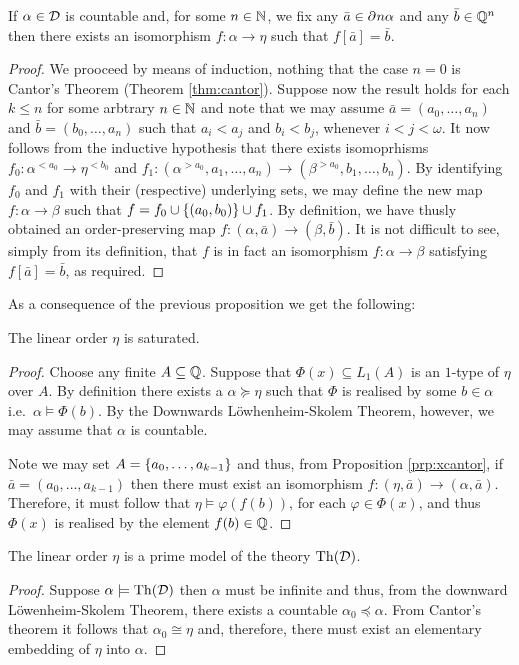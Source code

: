 \begin{prp}\label{prp:xcantor}
	If $\alpha\in\mathcal{D}$ is countable and, for some $n\in\mathbb{N}$, we fix any
	$\bar{a}\in\partial^{}{n}\alpha$ and any $\bar{b}\in\mathbb{Q}^n$ then there exists an
	isomorphism $f\colon\alpha\to\eta$ such that $f[\bar{a}]=\bar{b}$.
\end{prp}
\begin{proof}
	We prooceed by means of induction, nothing that the case $n=0$ is Cantor's
	Theorem (Theorem \ref{thm:cantor}).  Suppose now the result holds for each
	$k\leq n$ for some arbtrary $n\in\mathbb{N}$ and note that we may assume
	$\bar{a}=(a_0,\dotsc,a_n)$ and $\bar{b}=(b_0,\dotsc,a_n)$ such that $a_i<a_j$
	and $b_i<b_j$, whenever $i<j<\omega$.  It now follows from the inductive
	hypothesis that there exists isomoprhisms $f_0\colon\alpha^{<a_0}\to\eta^{<b_0}$
	and $f_1\colon(\alpha^{>a_0},a_1,\dotsc,a_n)\to(\beta^{>a_0},b_1,\dotsc,b_n)$.
	By identifying $f_0$ and $f_1$ with their (respective) underlying sets, we may
	define the new map $f\colon\alpha\to\beta$ such that
	$f=f_0\cup\left\lbrace (a_0,b_0)\right\rbrace\cup f_1$.  By definition, we have thusly obtained an
	order-preserving map $f\colon(\alpha,\bar{a})\to(\beta,\bar{b})$.  It is not
	difficult to see, simply from its definition, that $f$ is in fact an isomorphism
	$f\colon\alpha\to\beta$ satisfying $f[\bar{a}]=\bar{b}$, as required.
\end{proof}

As a consequence of the previous proposition we get the following:
\begin{prp}
	The linear order $\eta$ is saturated.
\end{prp}
\begin{proof}
	Choose any finite $A\subseteq\mathbb{Q}$.  Suppose that $\Phi(x)\subseteq L_1(A)$
	is an $1$-type of $\eta$ over $A$.  By definition there exists a
	$\alpha\succcurlyeq\eta$ such that $\Phi$ is realised by some $b\in\alpha$ i.e.\
	$\alpha\models\Phi(b)$.  By the Downwards L\"owhenheim-Skolem Theorem, however,
	we may assume that $\alpha$ is countable.

	Note we may set $A=\left\lbrace a_0,\dotsc,a_{k-1}\right\rbrace$ and thus, from Proposition
	\ref{prp:xcantor}, if $\bar{a}=(a_0,\dotsc,a_{k-1})$ then there must exist an
	isomorphism $f\colon(\eta,\bar{a})\to(\alpha,\bar{a})$.  Therefore, it must
	follow that $\eta\models\varphi(f(b))$, for each $\varphi\in\Phi(x)$, and thus
	$\Phi(x)$ is realised by the element $f(b)\in\mathbb{Q}$.
\end{proof}


\begin{thm}
	The linear order $\eta$ is a prime model of the theory $\operatorname{Th}(\mathcal{D})$.
\end{thm}
\begin{proof}
	Suppose $\alpha\models\operatorname{Th}(\mathcal{D})$ then $\alpha$ must be infinite and thus, from the downward L\"owenheim-Skolem Theorem, there exists a countable $\alpha_0\preccurlyeq\alpha$.  From Cantor's theorem it follows that $\alpha_0\cong\eta$ and, therefore, there must exist an elementary embedding of $\eta$ into $\alpha$.
\end{proof}


